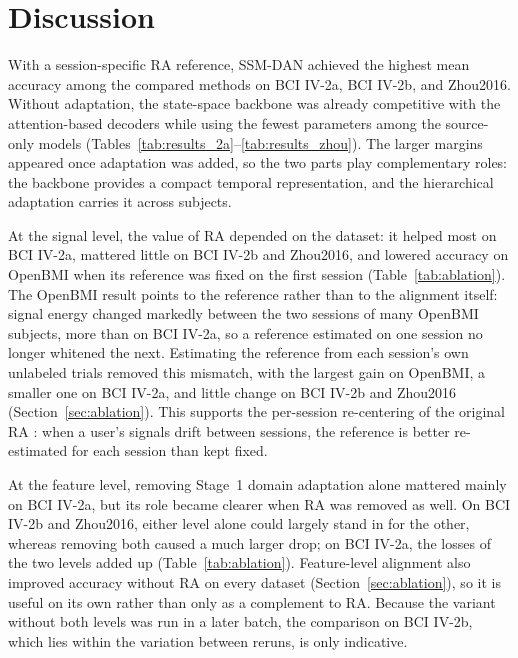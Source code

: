 \documentclass[preprint,12pt]{elsarticle}
\begin{document}
\section{Discussion}
\label{sec:discussion}

With a session-specific RA reference, SSM-DAN achieved the highest mean accuracy among the compared methods on BCI IV-2a, BCI IV-2b, and Zhou2016. Without adaptation, the state-space backbone was already competitive with the attention-based decoders while using the fewest parameters among the source-only models (Tables~\ref{tab:results_2a}--\ref{tab:results_zhou}). The larger margins appeared once adaptation was added, so the two parts play complementary roles: the backbone provides a compact temporal representation, and the hierarchical adaptation carries it across subjects.

At the signal level, the value of RA depended on the dataset: it helped most on BCI IV-2a, mattered little on BCI IV-2b and Zhou2016, and lowered accuracy on OpenBMI when its reference was fixed on the first session (Table~\ref{tab:ablation}). The OpenBMI result points to the reference rather than to the alignment itself\label{subsec:ra_reference}: signal energy changed markedly between the two sessions of many OpenBMI subjects, more than on BCI IV-2a, so a reference estimated on one session no longer whitened the next. Estimating the reference from each session's own unlabeled trials removed this mismatch, with the largest gain on OpenBMI, a smaller one on BCI IV-2a, and little change on BCI IV-2b and Zhou2016 (Section~\ref{sec:ablation}). This supports the per-session re-centering of the original RA \cite{zanini2018riemannian}: when a user's signals drift between sessions, the reference is better re-estimated for each session than kept fixed.

At the feature level, removing Stage~1 domain adaptation alone mattered mainly on BCI IV-2a, but its role became clearer when RA was removed as well. On BCI IV-2b and Zhou2016, either level alone could largely stand in for the other, whereas removing both caused a much larger drop; on BCI IV-2a, the losses of the two levels added up (Table~\ref{tab:ablation}). Feature-level alignment also improved accuracy without RA on every dataset (Section~\ref{sec:ablation}), so it is useful on its own rather than only as a complement to RA. Because the variant without both levels was run in a later batch, the comparison on BCI IV-2b, which lies within the variation between reruns, is only indicative.
\end{document}
